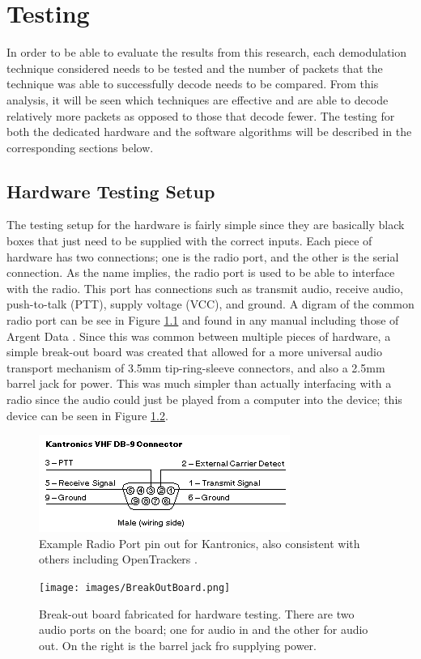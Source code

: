 \chapter{Testing}
In order to be able to evaluate the results from this research, each demodulation technique considered needs to be tested and the number of packets that the technique was able to successfully decode needs to be compared. From this analysis, it will be seen which techniques are effective and are able to decode relatively more packets as opposed to those that decode fewer. The testing for both the dedicated hardware and the software algorithms will be described in the corresponding sections below.

\section{Hardware Testing Setup}
The testing setup for the hardware is fairly simple since they are basically black boxes that just need to be supplied with the correct inputs. Each piece of hardware has two connections; one is the radio port, and the other is the serial connection. As the name implies, the radio port is used to be able to interface with the radio. This port has connections such as transmit audio, receive audio, push-to-talk (PTT), supply voltage (VCC), and ground. A digram of the common radio port can be see in Figure \ref{RadioPortPinout} and found in any manual including those of Argent Data \cite{Systems2013}. Since this was common between multiple pieces of hardware, a simple break-out board was created that allowed for a more universal audio transport mechanism of 3.5mm tip-ring-sleeve connectors, and also a 2.5mm barrel jack for power. This was much simpler than actually interfacing with a radio since the audio could just be played from a computer into the device; this device can be seen in Figure \ref{BreakOutBoard}. 

\begin{figure}
  \centering
	\includegraphics[width=0.75\linewidth]{images/RadioPortPinout.png} 
	\caption{Example Radio Port pin out for Kantronics, also consistent with others including OpenTrackers \cite{Martin2014}.}
   \label{RadioPortPinout}
\end{figure}
\begin{figure}
  \centering
	\texttt{[image: images/BreakOutBoard.png]} 
	\caption{Break-out board fabricated for hardware testing. There are two audio ports on the board; one for audio in and the other for audio out. On the right is the barrel jack fro supplying power.}
   \label{BreakOutBoard}
\end{figure}

